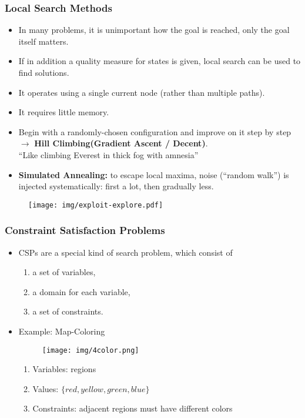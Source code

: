 \documentclass[UTF8,11pt,colorlinks,compress,openany]{beamer}%
\begin{document}
\begin{frame}\frametitle{Local Search Methods}
\begin{itemize}
	\item In many problems, it is unimportant how the goal is reached, only the goal itself matters.
	\item If in addition a quality measure for states is given, local search can be used to find solutions.
	\item It operates using a single current node (rather than multiple paths).
	\item It requires little memory.
	\item Begin with a randomly-chosen configuration and improve on it step by step $\to$ \textbf{Hill Climbing(Gradient Ascent / Decent)}.\\
	``Like climbing Everest in thick fog with amnesia''
	\item \textbf{Simulated Annealing:} to escape local maxima, noise (``random walk'') is injected systematically: first a lot, then gradually less.
\end{itemize}
\begin{figure}[H]
	\texttt{[image: img/exploit-explore.pdf]}
\end{figure}
\end{frame}

\begin{frame}\frametitle{Constraint Satisfaction Problems}
\begin{itemize}
	\item CSPs are a special kind of search problem, which consist of
	\begin{enumerate}
		\item a set of variables,
		\item a domain for each variable,
		\item a set of constraints.
	\end{enumerate}
	\item Example: Map-Coloring
	\begin{figure}[H]
	\texttt{[image: img/4color.png]}
	\end{figure}
	\begin{enumerate}
		\item Variables: regions
		\item Values: $\{red,yellow,green,blue\}$
		\item Constraints: adjacent regions must have different colors
	\end{enumerate}
\end{itemize}
\end{frame}
\end{document}
